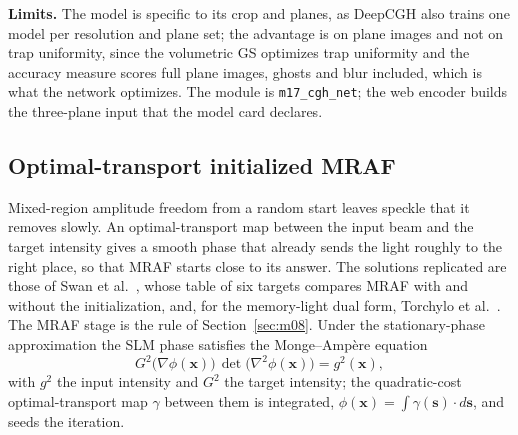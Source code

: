 \textbf{Limits.} The model is specific to its crop and planes, as DeepCGH also trains one model per resolution and plane set; the advantage is on plane images and not on trap uniformity, since the volumetric GS optimizes trap uniformity and the accuracy measure scores full plane images, ghosts and blur included, which is what the network optimizes. The module is \texttt{m17\_cgh\_net}; the web encoder builds the three-plane input that the model card declares.

\subsection{Optimal-transport initialized MRAF}\label{sec:m18}

Mixed-region amplitude freedom from a random start leaves speckle that it removes slowly. An optimal-transport map between the input beam and the target intensity gives a smooth phase that already sends the light roughly to the right place, so that MRAF starts close to its answer. The solutions replicated are those of Swan et al.~\cite{swan}, whose table of six targets compares MRAF with and without the initialization, and, for the memory-light dual form, Torchylo et al.~\cite{torchylo}. The MRAF stage is the rule of Section~\ref{sec:m08}. Under the stationary-phase approximation the SLM phase satisfies the Monge--Amp\`ere equation
\begin{equation}
G^2\big(\nabla\phi(\mathbf x)\big)\,\det\big(\nabla^2\phi(\mathbf x)\big)=g^2(\mathbf x),
\label{eq:m18}
\end{equation}
with $g^2$ the input intensity and $G^2$ the target intensity; the quadratic-cost optimal-transport map $\gamma$ between them is integrated, $\phi(\mathbf x)=\int\gamma(\mathbf s)\cdot d\mathbf s$, and seeds the iteration.

